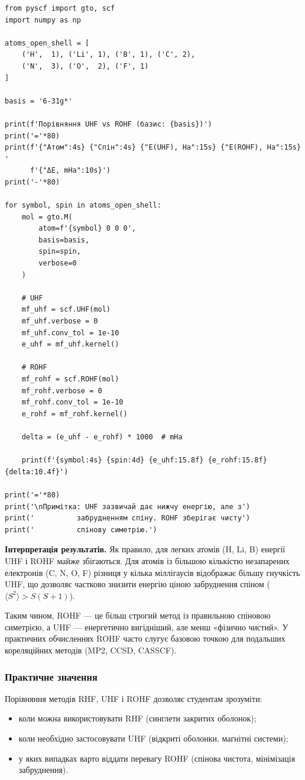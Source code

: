 \begin{verbatim}
from pyscf import gto, scf
import numpy as np

atoms_open_shell = [
    ('H',  1), ('Li', 1), ('B', 1), ('C', 2),
    ('N',  3), ('O',  2), ('F', 1)
]

basis = '6-31g*'

print(f'Порівняння UHF vs ROHF (базис: {basis})')
print('='*80)
print(f'{"Атом":4s} {"Спін":4s} {"E(UHF), Ha":15s} {"E(ROHF), Ha":15s} '
      f'{"ΔE, mHa":10s}')
print('-'*80)

for symbol, spin in atoms_open_shell:
    mol = gto.M(
        atom=f'{symbol} 0 0 0',
        basis=basis,
        spin=spin,
        verbose=0
    )

    # UHF
    mf_uhf = scf.UHF(mol)
    mf_uhf.verbose = 0
    mf_uhf.conv_tol = 1e-10
    e_uhf = mf_uhf.kernel()

    # ROHF
    mf_rohf = scf.ROHF(mol)
    mf_rohf.verbose = 0
    mf_rohf.conv_tol = 1e-10
    e_rohf = mf_rohf.kernel()

    delta = (e_uhf - e_rohf) * 1000  # mHa

    print(f'{symbol:4s} {spin:4d} {e_uhf:15.8f} {e_rohf:15.8f} {delta:10.4f}')

print('='*80)
print('\nПримітка: UHF зазвичай дає нижчу енергію, але з')
print('          забрудненням спіну. ROHF зберігає чисту')
print('          спінову симетрію.')
\end{verbatim}


\noindent
\textbf{Інтерпретація результатів.}
Як правило, для легких атомів (H, Li, B) енергії UHF і ROHF майже збігаються.
Для атомів із більшою кількістю незапарених електронів (C, N, O, F)
різниця у кілька міллігаусів відображає більшу гнучкість UHF,
що дозволяє частково знизити енергію ціною забруднення спіном
($\langle S^2 \rangle > S(S+1)$).

Таким чином, ROHF --- це більш строгий метод із правильною спіновою симетрією,
а UHF --- енергетично вигідніший, але менш «фізично чистий». У практичних
обчисленнях ROHF часто слугує базовою точкою для подальших кореляційних
методів (MP2, CCSD, CASSCF).

\subsubsection{Практичне значення}

Порівняння методів RHF, UHF і ROHF дозволяє студентам зрозуміти:
\begin{itemize}
    \item коли можна використовувати RHF (синглети закритих оболонок);
    \item коли необхідно застосовувати UHF (відкриті оболонки, магнітні системи);
    \item у яких випадках варто віддати перевагу ROHF (спінова чистота, мінімізація забруднення).
\end{itemize}

